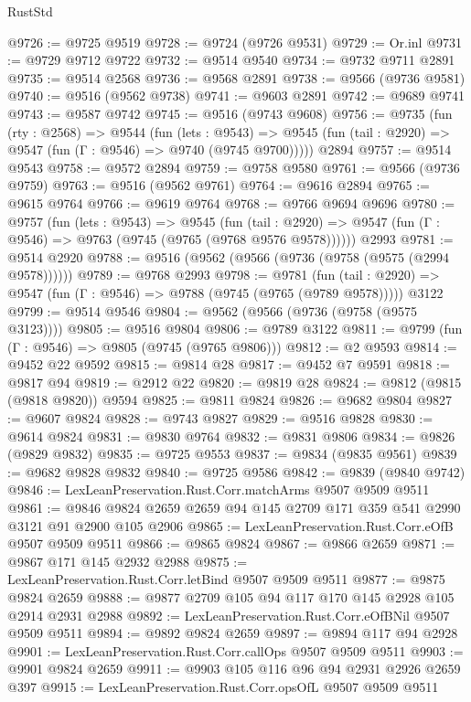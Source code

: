 \begin{lexlean}{RustStd}
\begin{coremodule}
@9726 := @9725 @9519
@9728 := @9724 (@9726 @9531)
@9729 := Or.inl
@9731 := @9729 @9712 @9722
@9732 := @9514 @9540
@9734 := @9732 @9711 @2891
@9735 := @9514 @2568
@9736 := @9568 @2891
@9738 := @9566 (@9736 @9581)
@9740 := @9516 (@9562 @9738)
@9741 := @9603 @2891
@9742 := @9689 @9741
@9743 := @9587 @9742
@9745 := @9516 (@9743 @9608)
@9756 := @9735
    (fun (rty : @2568) =>
    @9544
      (fun (lets : @9543) =>
      @9545 (fun (tail : @2920) => @9547 (fun (Γ : @9546) => @9740 (@9745 @9700)))))
    @2894
@9757 := @9514 @9543
@9758 := @9572 @2894
@9759 := @9758 @9580
@9761 := @9566 (@9736 @9759)
@9763 := @9516 (@9562 @9761)
@9764 := @9616 @2894
@9765 := @9615 @9764
@9766 := @9619 @9764
@9768 := @9766 @9694 @9696
@9780 := @9757
    (fun (lets : @9543) =>
    @9545
      (fun (tail : @2920) => @9547 (fun (Γ : @9546) => @9763 (@9745 (@9765 (@9768 @9576 @9578))))))
    @2993
@9781 := @9514 @2920
@9788 := @9516 (@9562 (@9566 (@9736 (@9758 (@9575 (@2994 @9578))))))
@9789 := @9768 @2993
@9798 := @9781
    (fun (tail : @2920) => @9547 (fun (Γ : @9546) => @9788 (@9745 (@9765 (@9789 @9578)))))
    @3122
@9799 := @9514 @9546
@9804 := @9562 (@9566 (@9736 (@9758 (@9575 @3123))))
@9805 := @9516 @9804
@9806 := @9789 @3122
@9811 := @9799 (fun (Γ : @9546) => @9805 (@9745 (@9765 @9806)))
@9812 := @2 @9593
@9814 := @9452 @22 @9592
@9815 := @9814 @28
@9817 := @9452 @7 @9591
@9818 := @9817 @94
@9819 := @2912 @22
@9820 := @9819 @28
@9824 := @9812 (@9815 (@9818 @9820)) @9594
@9825 := @9811 @9824
@9826 := @9682 @9804
@9827 := @9607 @9824
@9828 := @9743 @9827
@9829 := @9516 @9828
@9830 := @9614 @9824
@9831 := @9830 @9764
@9832 := @9831 @9806
@9834 := @9826 (@9829 @9832)
@9835 := @9725 @9553
@9837 := @9834 (@9835 @9561)
@9839 := @9682 @9828 @9832
@9840 := @9725 @9586
@9842 := @9839 (@9840 @9742)
@9846 := LexLeanPreservation.Rust.Corr.matchArms @9507 @9509 @9511
@9861 := @9846 @9824 @2659 @2659 @94 @145 @2709 @171 @359 @541 @2990 @3121 @91 @2900 @105 @2906
@9865 := LexLeanPreservation.Rust.Corr.eOfB @9507 @9509 @9511
@9866 := @9865 @9824
@9867 := @9866 @2659
@9871 := @9867 @171 @145 @2932 @2988
@9875 := LexLeanPreservation.Rust.Corr.letBind @9507 @9509 @9511
@9877 := @9875 @9824 @2659
@9888 := @9877 @2709 @105 @94 @117 @170 @145 @2928 @105 @2914 @2931 @2988
@9892 := LexLeanPreservation.Rust.Corr.eOfBNil @9507 @9509 @9511
@9894 := @9892 @9824 @2659
@9897 := @9894 @117 @94 @2928
@9901 := LexLeanPreservation.Rust.Corr.callOps @9507 @9509 @9511
@9903 := @9901 @9824 @2659
@9911 := @9903 @105 @116 @96 @94 @2931 @2926 @2659 @397
@9915 := LexLeanPreservation.Rust.Corr.opsOfL @9507 @9509 @9511

\end{coremodule}
\end{lexlean}
